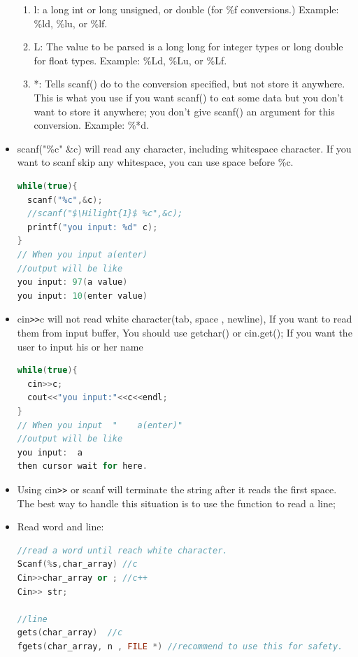 \documentclass[a4paper,12pt,twoside]{book}
\newcommand{\Hilight}[1]{\makebox[0pt][l]{\color{yellow}\rule[-3pt]{#1em}{11pt}}}
\begin{document}
\begin{itemize}
\begin{enumerate}
\item l:  a long int or long unsigned, or double (for \%f conversions.) Example: \%ld, \%lu, or \%lf.

\item L: The value to be parsed is a long long for integer types or long double for float types. Example: \%Ld, \%Lu, or \%Lf.

\item *: Tells scanf() do to the conversion specified, but not store it anywhere. This is what you use if you want scanf() to eat some data but you don't want to store it anywhere; you don't give scanf() an argument for this conversion. Example: \%*d.
\end{enumerate}


\item scanf("\%c" \&c) will read any character, including whitespace character. If you want to scanf skip any whitespace, you can use space before \%c.

\begin{lstlisting}[frame=single, language=c++, mathescape=true]
while(true){
  scanf("%c",&c);
  //scanf("$\Hilight{1}$ %c",&c);
  printf("you input: %d" c);
}
// When you input a(enter)
//output will be like
you input: 97(a value)
you input: 10(enter value)
\end{lstlisting}


\item cin\verb=>>=c will not read white character(tab, space , newline), If you want to read them from input buffer, You should use getchar() or cin.get(); If you want the user to input his or her name
\begin{lstlisting}[frame=single, language=c++, mathescape=true]
while(true){
  cin>>c;
  cout<<"you input:"<<c<<endl;
}
// When you input  "    a(enter)"
//output will be like
you input:  a
then cursor wait for here.
\end{lstlisting}

\item Using cin\verb=>>= or scanf will terminate the string after it reads the first space. The best way to handle this situation is to use the function to read a line;

\item Read word and line:
\begin{lstlisting}[frame=single, language=c++]
//read a word until reach white character.
Scanf(%s,char_array) //c
Cin>>char_array or ; //c++
Cin>> str;

//line	
gets(char_array)  //c
fgets(char_array, n , FILE *) //recommend to use this for safety.


\end{lstlisting}
\end{itemize}
\end{document}
